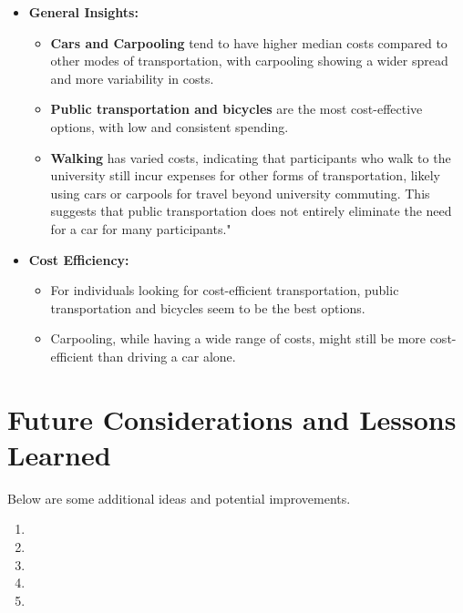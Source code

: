 \begin{itemize}
    \item \textbf{General Insights:}
    \begin{itemize}
        \item \textbf{Cars and Carpooling} tend to have higher median costs compared to other modes of transportation, with carpooling showing a wider spread and more variability in costs.
        \item \textbf{Public transportation and bicycles} are the most cost-effective options, with low and consistent spending.
        \item \textbf{Walking} has varied costs, indicating that participants who walk to the university still incur expenses for other forms of transportation, likely using cars or carpools for travel beyond university commuting. This suggests that public transportation does not entirely eliminate the need for a car for many participants."

    \end{itemize}

    \item \textbf{Cost Efficiency:}
    \begin{itemize}
        \item For individuals looking for cost-efficient transportation, public transportation and bicycles seem to be the best options.
        \item Carpooling, while having a wide range of costs, might still be more cost-efficient than driving a car alone.
    \end{itemize}
\end{itemize}

\chapter{Future Considerations and Lessons Learned}
\label{FutureConsiderations}
Below are some additional ideas and potential improvements. 
\begin{enumerate}
    \item {}
    \item {}
    \item {}
    \item {}
    \item {}

\end{enumerate}